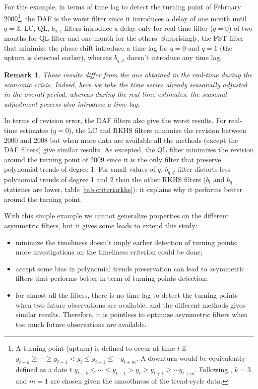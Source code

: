 \documentclass[
  12pt,
  ,
  a4paper]{article}
\newcommand\1{\mathds{1}}
\newtheorem*{remark}{Remark}
\begin{document}
For this example, in terms of time lag to detect the turning point of February 2009\footnote{A turning point (upturn) is defined to occur at time \(t\) if \(y_{t-k}\geq\cdots\geq y_{t-1}<y_t\leq y_{t+1}\leq\cdots y_{t+m}\).
  A downturn would be equivalently defined as a date \(t\) \(y_{t-k}\leq\cdots\leq y_{t-1}>y_t\geq y_{t+1}\geq\cdots y_{t+m}\).
  Following \textcite{Zellner1991}, \(k=3\) and \(m=1\) are chosen given the smoothness of the trend-cycle data. }, the DAF is the worst filter since it introduces a delay of one month until \(q=3\).
LC, QL, \(b_{q,\gamma}\) filters introduce a delay only for real-time filter (\(q=0\)) of two months for QL filter and one month for the others.
Surprisingly, the FST filter that minimize the phase shift introduce a time lag for \(q=0\) and \(q=1\) (the upturn is detected earlier), whereas \(b_{q,\phi}\) doesn't introduce any time lag.

\begin{remark}

Those results differ from the one obtained in the real-time during the economic crisis.
Indeed, here we take the time series already seasonally adjusted in the overall period, whereas during the real-time estimates, the seasonal adjustment process also introduce a time lag.

\end{remark}

In terms of revision error, the DAF filters also give the worst results.
For real-time estimates (\(q=0\)), the LC and RKHS filters minimize the revision between 2000 and 2008 but when more data are available all the methods (except the DAF filters) give similar results.
As excepted, the QL filter minimizes the revision around the turning point of 2009 since it is the only filter that preserve polynomial trends of degree 1.
For small values of \(q\), \(b_{q,\phi}\) filter distorts less polynomial trends of degree 1 and 2 than the other RKHS filters (\(b_l\) and \(b_q\) statistics are lower, table \ref{tab:criteriarkhs}): it explains why it performs better around the turning point.

With this simple example we cannot generalize properties on the different asymmetric filters, but it gives some leads to extend this study:

\begin{itemize}
\item
  minimize the timeliness doesn't imply earlier detection of turning points: more investigations on the timeliness criterion could be done;
\item
  accept some bias in polynomial trends preservation can lead to asymmetric filters that performs better in term of turning points detection;
\item
  for almost all the filters, there is no time lag to detect the turning points when two future observations are available, and the different methods gives similar results.
  Therefore, it is pointless to optimize asymmetric filters when too much future observations are available.
\end{itemize}
\end{document}
